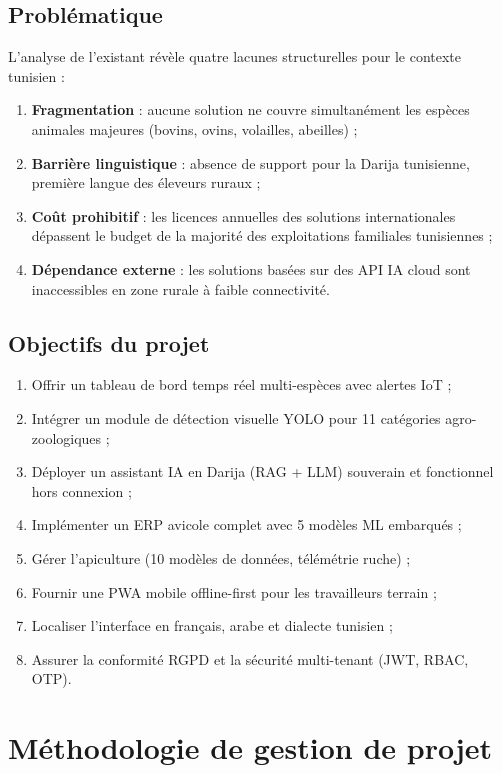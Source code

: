 \subsection{Problématique}
L'analyse de l'existant révèle quatre lacunes structurelles pour le contexte
tunisien :
\begin{enumerate}
  \item \textbf{Fragmentation} : aucune solution ne couvre simultanément
        les espèces animales majeures (bovins, ovins, volailles, abeilles) ;
  \item \textbf{Barrière linguistique} : absence de support pour la Darija
        tunisienne, première langue des éleveurs ruraux ;
  \item \textbf{Coût prohibitif} : les licences annuelles des solutions
        internationales dépassent le budget de la majorité des exploitations
        familiales tunisiennes ;
  \item \textbf{Dépendance externe} : les solutions basées sur des API IA
        cloud sont inaccessibles en zone rurale à faible connectivité.
\end{enumerate}

\subsection{Objectifs du projet}
\begin{enumerate}
  \item Offrir un tableau de bord temps réel multi-espèces avec alertes IoT ;
  \item Intégrer un module de détection visuelle YOLO pour 11 catégories
        agro-zoologiques ;
  \item Déployer un assistant IA en Darija (RAG + LLM) souverain et
        fonctionnel hors connexion ;
  \item Implémenter un ERP avicole complet avec 5 modèles ML embarqués ;
  \item Gérer l'apiculture (10 modèles de données, télémétrie ruche) ;
  \item Fournir une PWA mobile offline-first pour les travailleurs terrain ;
  \item Localiser l'interface en français, arabe et dialecte tunisien ;
  \item Assurer la conformité RGPD et la sécurité multi-tenant (JWT, RBAC, OTP).
\end{enumerate}

\section{Méthodologie de gestion de projet}

